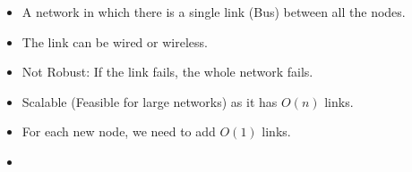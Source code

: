 \documentclass[a4paper, twoside]{report}
\begin{document}
\begin{itemize}
    \item A network in which there is a single link (Bus) between all the nodes.
    \item The link can be wired or wireless.
    \item Not Robust: If the link fails, the whole network fails.
    \item Scalable (Feasible for large networks) as it has $O(n)$ links.
    \item For each new node, we need to add $O(1)$ links.
    \item 

        
\end{itemize}
\end{document}
